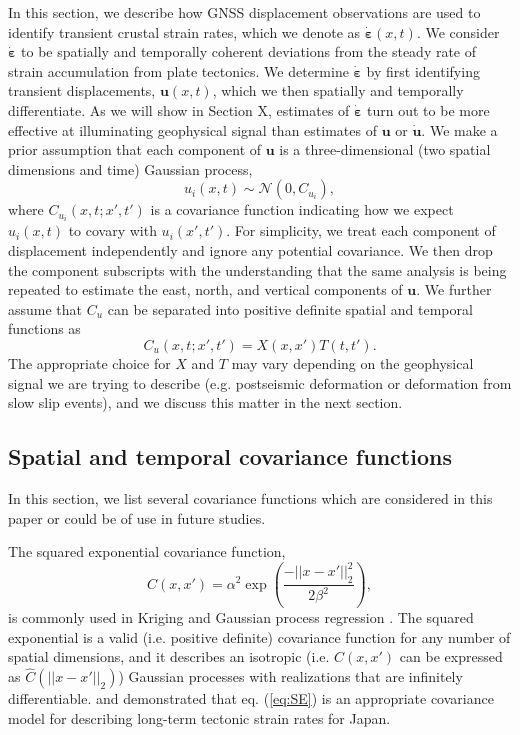 \documentclass[10pt,a4paper]{article}
\begin{document}
In this section, we describe how GNSS displacement observations are used to identify transient crustal strain rates, which we denote as $\dot{\bm{\varepsilon}}(x,t)$. We consider $\dot{\bm{\varepsilon}}$ to be spatially and temporally coherent deviations from the steady rate of strain accumulation from plate tectonics. We determine $\dot{\bm{\varepsilon}}$ by first identifying transient displacements, $\bm{u}(x,t)$, which we then spatially and temporally differentiate.  As we will show in Section X, estimates of $\dot{\bm{\varepsilon}}$ turn out to be more effective at illuminating geophysical signal than estimates of $\bm{u}$ or $\dot{\bm{u}}$.  We make a prior assumption that each component of $\mathbf{u}$ is a three-dimensional (two spatial dimensions and time) Gaussian process,
\begin{equation}\label{eq:TransientDeformation}
u_i(x,t) \sim \mathcal{N}\left(0,C_{u_i}\right),
\end{equation}
where $C_{u_i}(x,t;x',t')$ is a covariance function indicating how we expect $u_i(x,t)$ to covary with $u_i(x',t')$. For simplicity, we treat each component of displacement independently and ignore any potential covariance. We then drop the component subscripts with the understanding that the same analysis is being repeated to estimate the east, north, and vertical components of $\bm{u}$. We further assume that $C_u$ can be separated into positive definite spatial and temporal functions as 
\begin{equation}\label{eq:TransientCovariance}
C_{u}(x,t;x',t') = X(x,x')T(t,t').
\end{equation}  
The appropriate choice for $X$ and $T$ may vary depending on the geophysical signal we are trying to describe (e.g. postseismic deformation or deformation from slow slip events), and we discuss this matter in the next section.  

\subsection{Spatial and temporal covariance functions}
In this section, we list several covariance functions which are considered in this paper or could be of use in future studies.

The squared exponential covariance function,
\begin{equation}\label{eq:SE}
C(x,x') = \alpha^2 \exp\left(\frac{-||x - x'||_2^2}{2 \beta^2}\right),
\end{equation}
is commonly used in Kriging \citep[e.g,][]{Cressie1992} and Gaussian process regression \citep[e.g.,][]{Rasmussen2006}.  The squared exponential is a valid (i.e. positive definite) covariance function for any number of spatial dimensions, and it describes an isotropic (i.e. $C(x,x')$ can be expressed as $\hat{C}(||x - x'||_2)$) Gaussian processes with realizations that are infinitely differentiable.  \citet{Kato1998} and \cite{El-Fiky1999} demonstrated that eq. (\ref{eq:SE}) is an appropriate covariance model for describing long-term tectonic strain rates for Japan.  
\end{document}
